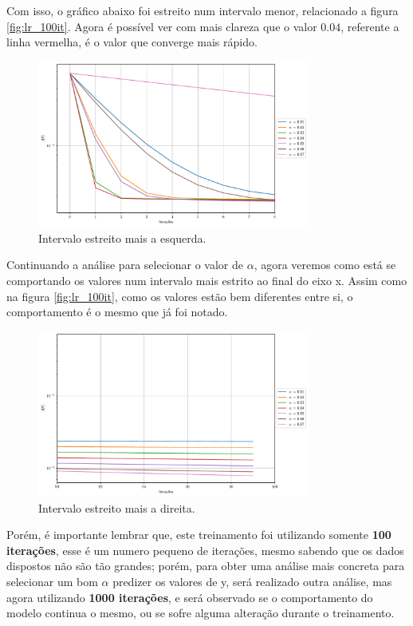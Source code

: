 \documentclass[a4paper, 12pt]{article}
\begin{document}
Com isso, o gráfico abaixo foi estreito num intervalo menor, relacionado a figura \ref{fig:lr_100it}. Agora é possível
ver com mais clareza que o valor $0.04$, referente a linha vermelha, é o valor que converge mais rápido.
\begin{figure}[!h]
    \centering
    \includegraphics[width=0.8\textwidth]{../imgs/lower_interval.pdf}
    \caption{Intervalo estreito mais a esquerda.}
    \label{fig:lower_interval}
\end{figure}
\clearpage

Continuando a análise para selecionar o valor de $\alpha$, agora veremos como está se comportando os valores
num intervalo mais estrito ao final do eixo x. Assim como na figura \ref{fig:lr_100it}, como os valores estão
bem diferentes entre si, o comportamento é o mesmo que já foi notado.
\begin{figure}[!h]
    \centering
    \includegraphics[width=0.8\textwidth]{../imgs/higher_interval_100it.pdf}
    \caption{Intervalo estreito mais a direita.}
    \label{fig:higher_interval_100it}
\end{figure}

Porém, é importante lembrar que, este treinamento foi utilizando somente \textbf{100 iterações}, esse é um numero
pequeno de iterações, mesmo sabendo que os dados dispostos não são tão grandes; porém, para obter uma análise
mais concreta para selecionar um bom $\alpha$ predizer os valores de y, será realizado outra análise, mas agora
utilizando \textbf{1000 iterações}, e será observado se o comportamento do modelo continua o mesmo, ou se sofre alguma
alteração durante o treinamento.
\clearpage
\end{document}
